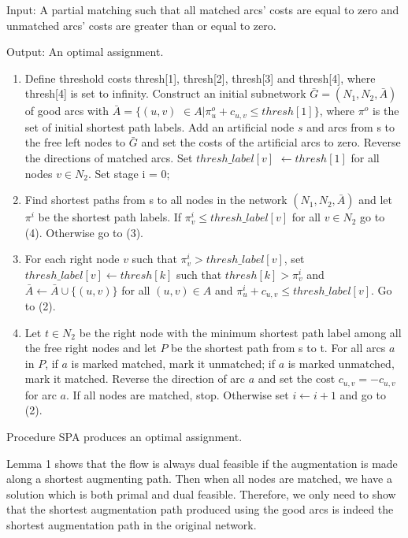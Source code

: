 \vskip 5pt

{\it 

Input: A partial matching such that all matched arcs' costs are equal
to zero and unmatched arcs' costs are greater than or equal to zero.

Output: An optimal assignment.

\begin{enumerate}

\item Define threshold costs thresh[1], thresh[2], thresh[3] and
thresh[4], where thresh[4] is set to infinity. Construct an initial
subnetwork $\bar G =(N_1,N_2,\bar A)$ of good arcs with $\bar A =\{
(u,v)$ $\in A|\pi^o_u + c_{u,v} \leq thresh[1]\}$, where $\pi^o$ is
the set of initial shortest path labels.  Add an artificial node $s$
and arcs from s to the free left nodes to $\bar G$ and set the costs
of the artificial arcs to zero.  Reverse the directions of matched
arcs.  Set $thresh\_label[v]$ $\leftarrow thresh[1]$ for all nodes
$v\in N_2$.  Set stage i = 0;

\item Find shortest paths from s to all nodes in the network
$(N_1,N_2,\bar A)$ and let $\pi^i$ be the shortest path labels. If
$\pi^i_v \leq thresh\_label[v]$ for all $v\in N_2$ go to (4).
Otherwise go to (3).

\item For each right node $v$ such that $\pi^i_v > thresh\_label[v]$,
set $thresh\_label[v]\leftarrow thresh[k]$ such that $thresh[k] >
\pi^i_v$ and $\bar A \leftarrow \bar A \cup \{(u,v)\}$ for all
$(u,v)\in A$ and $\pi^i_u + c_{u,v} \leq thresh\_label[v]$. Go to (2).

\item Let $t\in N_2$ be the right node with the minimum shortest path
label among all the free right nodes and let $P$ be the shortest path
from s to t.  For all arcs $a$ in $P$, if $a$ is marked matched, mark
it unmatched; if $a$ is marked unmatched, mark it matched. Reverse the
direction of arc $a$ and set the cost $c_{u,v} = - c_{u,v}$ for arc
$a$. If all nodes are matched, stop. Otherwise set $i \leftarrow i + 1$ and
go to (2).

\end{enumerate}
}

\vskip 2pt
 Procedure SPA produces an optimal
assignment.

\proof Lemma 1 shows that the flow is always dual feasible if the
augmentation is made along a shortest augmenting path. Then when all
nodes are matched, we have a solution which is both primal and dual
feasible.  Therefore, we only need to show that the shortest
augmentation path produced using the good arcs is indeed the shortest
augmentation path in the original network.

